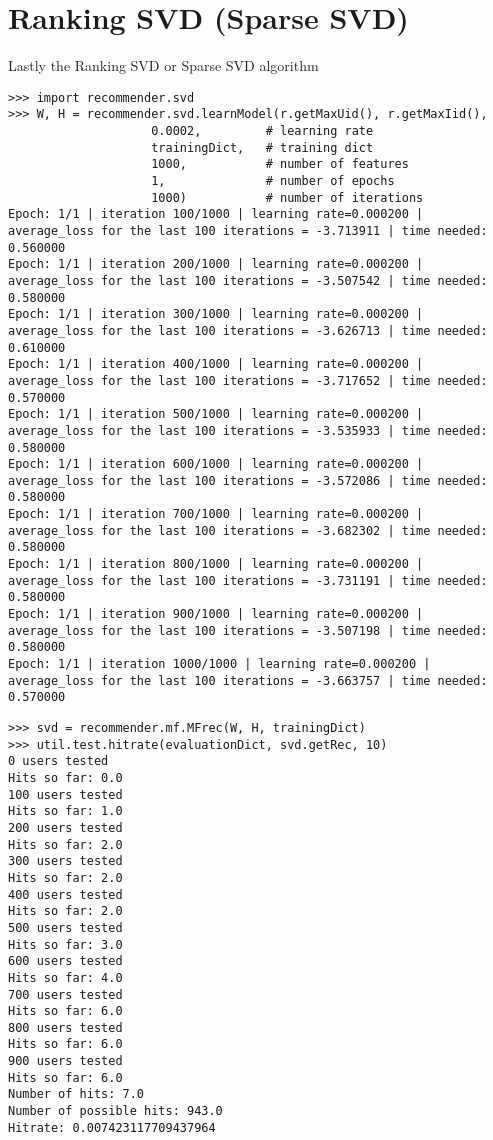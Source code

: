 \section{Ranking SVD (Sparse SVD)}
Lastly the Ranking SVD or Sparse SVD algorithm
\begin{lstlisting}
>>> import recommender.svd
>>> W, H = recommender.svd.learnModel(r.getMaxUid(), r.getMaxIid(),
                    0.0002,         # learning rate
                    trainingDict,   # training dict
                    1000,           # number of features
                    1,              # number of epochs
                    1000)           # number of iterations
Epoch: 1/1 | iteration 100/1000 | learning rate=0.000200 | average_loss for the last 100 iterations = -3.713911 | time needed: 0.560000
Epoch: 1/1 | iteration 200/1000 | learning rate=0.000200 | average_loss for the last 100 iterations = -3.507542 | time needed: 0.580000
Epoch: 1/1 | iteration 300/1000 | learning rate=0.000200 | average_loss for the last 100 iterations = -3.626713 | time needed: 0.610000
Epoch: 1/1 | iteration 400/1000 | learning rate=0.000200 | average_loss for the last 100 iterations = -3.717652 | time needed: 0.570000
Epoch: 1/1 | iteration 500/1000 | learning rate=0.000200 | average_loss for the last 100 iterations = -3.535933 | time needed: 0.580000
Epoch: 1/1 | iteration 600/1000 | learning rate=0.000200 | average_loss for the last 100 iterations = -3.572086 | time needed: 0.580000
Epoch: 1/1 | iteration 700/1000 | learning rate=0.000200 | average_loss for the last 100 iterations = -3.682302 | time needed: 0.580000
Epoch: 1/1 | iteration 800/1000 | learning rate=0.000200 | average_loss for the last 100 iterations = -3.731191 | time needed: 0.580000
Epoch: 1/1 | iteration 900/1000 | learning rate=0.000200 | average_loss for the last 100 iterations = -3.507198 | time needed: 0.580000
Epoch: 1/1 | iteration 1000/1000 | learning rate=0.000200 | average_loss for the last 100 iterations = -3.663757 | time needed: 0.570000
\end{lstlisting}

\begin{lstlisting}
>>> svd = recommender.mf.MFrec(W, H, trainingDict)
>>> util.test.hitrate(evaluationDict, svd.getRec, 10)
0 users tested
Hits so far: 0.0
100 users tested
Hits so far: 1.0
200 users tested
Hits so far: 2.0
300 users tested
Hits so far: 2.0
400 users tested
Hits so far: 2.0
500 users tested
Hits so far: 3.0
600 users tested
Hits so far: 4.0
700 users tested
Hits so far: 6.0
800 users tested
Hits so far: 6.0
900 users tested
Hits so far: 6.0
Number of hits: 7.0
Number of possible hits: 943.0
Hitrate: 0.007423117709437964
\end{lstlisting}
